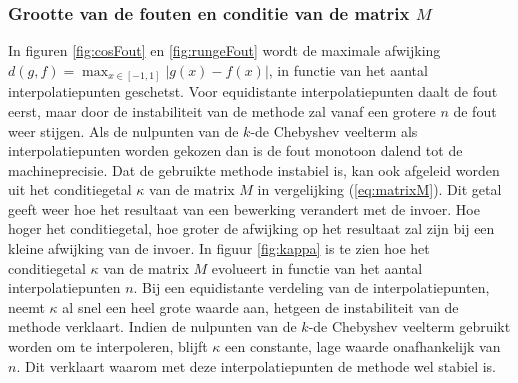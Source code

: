 \documentclass[a4paper, 12pt, titlepage, fleqn]{article}
\begin{document}
\subsubsection{Grootte van de fouten en conditie van de matrix $M$}
In figuren \ref{fig:cosFout} en \ref{fig:rungeFout} wordt de maximale afwijking $d(g,f) = \max_{x\in [-1,1]} | g(x) - f(x)|$, in functie van het aantal interpolatiepunten geschetst. Voor equidistante interpolatiepunten daalt de fout eerst, maar door de instabiliteit van de methode zal vanaf een grotere $n$ de fout weer stijgen. Als de nulpunten van de $k$-de Chebyshev veelterm als interpolatiepunten worden gekozen dan is de fout monotoon dalend tot de machineprecisie. Dat de gebruikte methode instabiel is, kan ook afgeleid worden uit het conditiegetal $\kappa$ van de matrix $M$ in vergelijking (\ref{eq:matrixM}). Dit getal geeft weer hoe het resultaat van een bewerking verandert met de invoer. Hoe hoger het conditiegetal, hoe groter de afwijking op het resultaat zal zijn bij een kleine afwijking van de invoer. In figuur \ref{fig:kappa} is te zien hoe het conditiegetal $\kappa$ van de matrix $M$ evolueert in functie van het aantal interpolatiepunten $n$. Bij een equidistante verdeling van de interpolatiepunten, neemt $\kappa$ al snel een heel grote waarde aan, hetgeen de instabiliteit van de methode verklaart. Indien de nulpunten van de $k$-de Chebyshev veelterm gebruikt worden om te interpoleren, blijft $\kappa$ een constante, lage waarde onafhankelijk van $n$. Dit verklaart waarom met deze interpolatiepunten de methode wel stabiel is.
\end{document}
